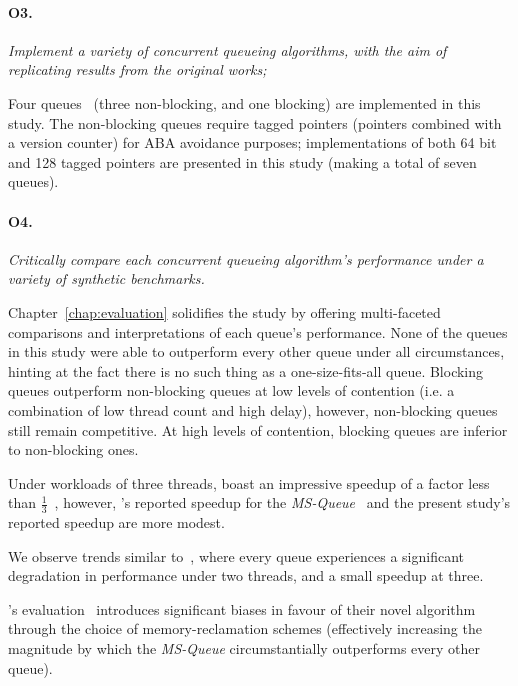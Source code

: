 \paragraph{O3.} \emph{Implement a variety of concurrent queueing algorithms, with the aim
of replicating results from the original works;}

Four queues~\citep{valois1994queues,hoffman2007baskets,michael1996simple} (three non-blocking, and one blocking) are implemented in this
study. The non-blocking queues require tagged pointers (pointers combined with a
version counter) for ABA avoidance purposes; implementations of both 64 bit and
128 tagged pointers are presented in this study (making a total of seven
queues).

\paragraph{O4.} \emph{Critically compare each concurrent queueing algorithm's performance
under a variety of synthetic benchmarks.}

Chapter~\ref{chap:evaluation} solidifies the study by offering multi-faceted
comparisons and interpretations of each queue's performance. None of the queues
in this study were able to outperform every other queue under all
circumstances, hinting at the fact there is no such thing as a
one-size-fits-all queue. Blocking queues outperform non-blocking queues at low
levels of contention (i.e. a combination of low thread count and high delay),
however, non-blocking queues still remain competitive. At high levels of
contention, blocking queues are inferior to non-blocking ones. 

Under workloads of three threads, \citeauthor{michael1996simple} boast an
impressive speedup of a factor less than $\frac{1}{3}$~\citep{michael1996simple},
however, \citeauthor{hoffman2007baskets}'s reported speedup for the
\emph{MS-Queue}~\citep{hoffman2007baskets} and the present study's reported
speedup are more modest.

We observe trends similar
to~\citep{ladan2008optimistic,hoffman2007baskets,michael1996simple}, where
every queue experiences a significant degradation in performance under two
threads, and a small speedup at three.

\citeauthor{michael1996simple}'s evaluation~\citep{michael1996simple}
introduces significant biases in favour of their novel algorithm through the
choice of memory-reclamation schemes (effectively increasing the magnitude by
which the \emph{MS-Queue} circumstantially outperforms every other queue).

